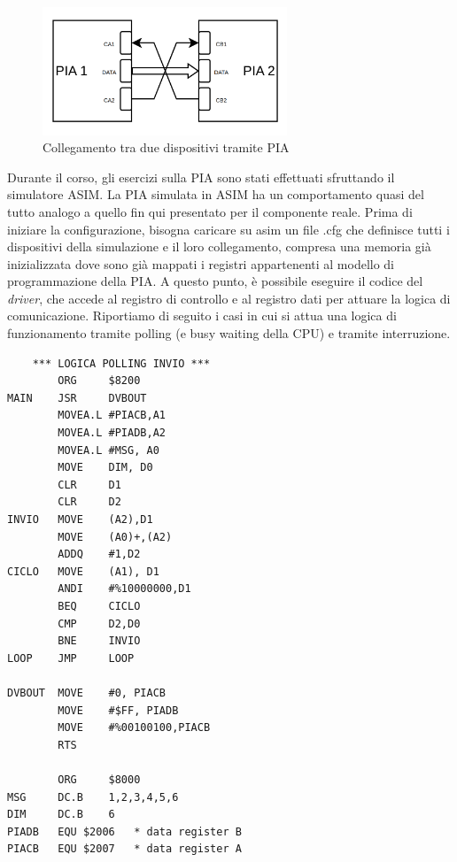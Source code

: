 \begin{figure}
    \centering
    \includegraphics[width=0.65\textwidth]{img/PIA-CON.png}
    \caption{Collegamento tra due dispositivi tramite PIA}\label{img:PIA-CON}
\end{figure}
Durante il corso, gli esercizi sulla PIA sono stati effettuati sfruttando il simulatore ASIM. La PIA simulata in ASIM ha un comportamento quasi del tutto analogo a quello fin qui presentato per il componente reale. Prima di iniziare la configurazione, bisogna caricare su asim un file .cfg che definisce tutti i dispositivi della simulazione e il loro collegamento, compresa una memoria già inizializzata dove sono già mappati i registri appartenenti al modello di programmazione della PIA.
A questo punto, è possibile eseguire il codice del \textit{driver}, che accede al registro di controllo e al registro dati per attuare la logica di comunicazione. 
Riportiamo di seguito i casi in cui si attua una logica di funzionamento tramite polling (e busy waiting della CPU) e tramite interruzione. 

\begin{lstlisting}
    *** LOGICA POLLING INVIO ***
        ORG     $8200
MAIN    JSR     DVBOUT
        MOVEA.L #PIACB,A1 
        MOVEA.L #PIADB,A2
        MOVEA.L #MSG, A0 
        MOVE    DIM, D0
        CLR     D1 
        CLR     D2
INVIO   MOVE    (A2),D1 
        MOVE    (A0)+,(A2)
        ADDQ    #1,D2 
CICLO   MOVE    (A1), D1 
        ANDI    #%10000000,D1 
        BEQ     CICLO
        CMP     D2,D0 
        BNE     INVIO 
LOOP    JMP     LOOP 

DVBOUT  MOVE    #0, PIACB
        MOVE    #$FF, PIADB
        MOVE    #%00100100,PIACB
        RTS

        ORG     $8000
MSG     DC.B    1,2,3,4,5,6
DIM     DC.B    6
PIADB   EQU $2006   * data register B
PIACB   EQU $2007   * data register A
\end{lstlisting}

